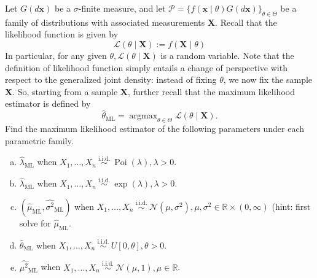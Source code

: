 \begin{exercise}
    Let \(G(d \mathbf{x})\) be a \(\sigma\)-finite measure, and let \(\mathcal{P}=\{f(\mathbf{x} \mid \theta) G(d \mathbf{x})\}_{\theta \in \Theta}\) be a family of distributions with associated measurements \(\mathbf{X}\). Recall that the likelihood function is given by
    \[
    \mathcal{L}(\theta \mid \mathbf{X}):=f(\mathbf{X} \mid \theta)
    \]
    In particular, for any given \(\theta, \mathcal{L}(\theta \mid \mathbf{X})\) is a random variable. Note that the definition of likelihood function simply entails a change of perspective with respect to the generalized joint density: instead of fixing \(\theta\), we now fix the sample \(\mathbf{X}\). So, starting from a sample \(\mathbf{X}\), further recall that the maximum likelihood estimator is defined by
    \[
        \widehat{\theta}_{\mathrm{ML}}=\operatorname{argmax}_{\theta \in \Theta} \mathcal{L}(\theta \mid \mathbf{X}) .
    \]
    Find the maximum likelihood estimator of the following parameters under each parametric family. 
    \begin{enumerate}[(a)]
        \item \(\widehat{\lambda}_{\mathrm{ML}}\) when \(X_{1}, \ldots, X_{n} \stackrel{\text { i.i.d. }}{\sim} \operatorname{Poi}(\lambda), \lambda>0\). 
        \item \(\widehat{\lambda}_{\mathrm{ML}}\) when \(X_{1}, \ldots, X_{n} \stackrel{\text { i.i.d. }}{\sim} \exp (\lambda), \lambda>0\). 
        \item \(\left(\widehat{\mu}_{\mathrm{ML}}, \widehat{\sigma^{2}}_\mathrm{ML}\right)\) when \(X_{1}, \ldots, X_{n} \stackrel{\text { i.i.d. }}{\sim} \mathcal{N}\left(\mu, \sigma^{2}\right), \mu, \sigma^{2} \in \mathbb{R} \times(0, \infty)\) (hint: first solve for \(\widehat{\mu}_{\mathrm{ML}}\).
        \item \(\widehat{\theta}_{\mathrm{ML}}\) when \(X_{1}, \ldots, X_{n} \stackrel{\text { i.i.d. }}{\sim} U[0, \theta], \theta>0\). 
        \item \(\widehat{\mu^{2}}{ }_{\mathrm{ML}}\) when \(X_{1}, \ldots, X_{n} \stackrel{\text { i.i.d. }}{\sim} \mathcal{N}(\mu, 1), \mu \in \mathbb{R}\). 
    \end{enumerate}
\end{exercise}

